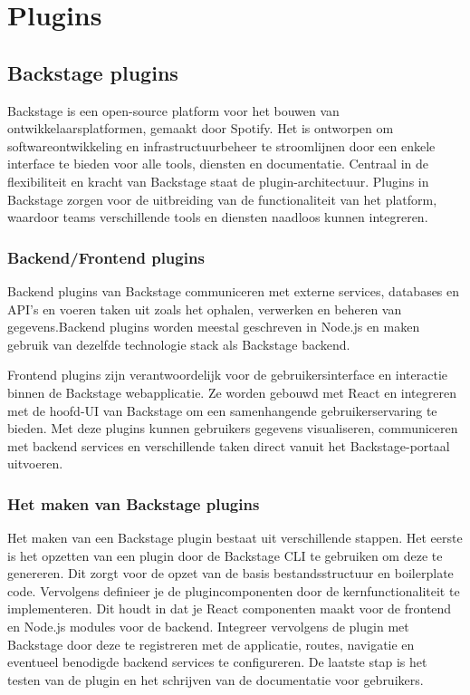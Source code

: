 \chapter{Plugins}
\label{ch:plugins}

\section{Backstage plugins}

Backstage is een open-source platform voor het bouwen van ontwikkelaarsplatformen, gemaakt door Spotify. Het is ontworpen om softwareontwikkeling en infrastructuurbeheer te stroomlijnen door een enkele interface te bieden voor alle tools, diensten en documentatie. Centraal in de flexibiliteit en kracht van Backstage staat de plugin-architectuur. Plugins in Backstage zorgen voor de uitbreiding van de functionaliteit van het platform, waardoor teams verschillende tools en diensten naadloos kunnen integreren.

\subsection{Backend/Frontend plugins}

Backend plugins van Backstage communiceren met externe services, databases en API's en voeren taken uit zoals het ophalen, verwerken en beheren van gegevens.Backend plugins worden meestal geschreven in Node.js en maken gebruik van dezelfde technologie stack als Backstage backend.

Frontend plugins zijn verantwoordelijk voor de gebruikersinterface en interactie binnen de Backstage webapplicatie. Ze worden gebouwd met React en integreren met de hoofd-UI van Backstage om een samenhangende gebruikerservaring te bieden. Met deze plugins kunnen gebruikers gegevens visualiseren, communiceren met backend services en verschillende taken direct vanuit het Backstage-portaal uitvoeren.

\subsection{Het maken van Backstage plugins}

Het maken van een Backstage plugin bestaat uit verschillende stappen. Het eerste is het opzetten van een plugin door de Backstage CLI te gebruiken om deze te genereren. Dit zorgt voor de opzet van de basis bestandsstructuur en boilerplate code. Vervolgens definieer je de plugincomponenten door de kernfunctionaliteit te implementeren. Dit houdt in dat je React componenten maakt voor de frontend en Node.js modules voor de backend. Integreer vervolgens de plugin met Backstage door deze te registreren met de applicatie, routes, navigatie en eventueel benodigde backend services te configureren. De laatste stap is het testen van de plugin en het schrijven van de documentatie voor gebruikers.

